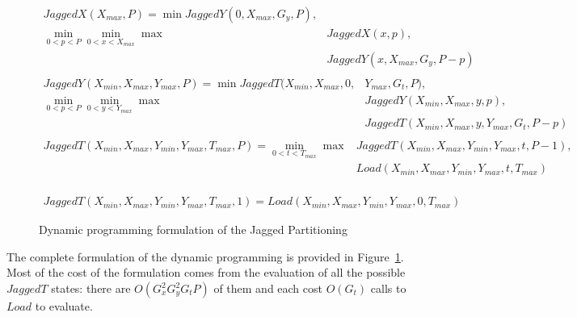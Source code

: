 \documentclass[10pt, conference, compsocconf]{IEEEtran}
\begin{document}
\begin{figure}
  \begin{equation}
    \begin{split}
    JaggedX(X_{max}, P)= \min JaggedY(0,X_{max}, G_y, P), & \\
                        \min_{0 < p < P} \min_{0<x<X_{max}} \max & JaggedX(x,p),\\
                                                     & JaggedY(x,X_{max}, G_y, P-p)\\
    \end{split}
  \end{equation}
  \begin{equation}
    \begin{split}
    JaggedY(X_{min}, X_{max}, Y_{max}, P)= \min JaggedT(X_{min},X_{max}, 0, & Y_{max}, G_t, P),  \\
                        \min_{0 < p < P} \min_{0<y<Y_{max}} \max & JaggedY(X_{min}, X_{max}, y, p),\\
                                                      & JaggedT(X_{min}, X_{max}, y,Y_{max}, G_t , P-p)\\
    \end{split}
  \end{equation}
  \begin{equation}
      \begin{split}
    JaggedT(X_{min}, X_{max}, Y_{min}, Y_{max}, T_{max}, P)= \min_{0<t<T_{max}} \max & JaggedT(X_{min}, X_{max}, Y_{min}, Y_{max}, t, P-1),\\
                                                                       & Load(X_{min}, X_{max}, Y_{min}, Y_{max}, t, T_{max})\\
      \end{split}
  \end{equation}

  \begin{equation}
    \begin{split}
      JaggedT(X_{min}, X_{max}, Y_{min}, Y_{max}, T_{max}, 1) = Load (X_{min}, X_{max}, Y_{min}, Y_{max}, 0, T_{max})
    \end{split}
  \end{equation}
      
  \caption{Dynamic programming formulation of the Jagged Partitioning}
  \label{fig:dp:jagged}
\end{figure}

The complete formulation of the dynamic programming is provided in
Figure~\ref{fig:dp:jagged}. Most of the cost of the formulation comes
from the evaluation of all the possible $JaggedT$ states: there are
$O(G_x^2 G_y^2 G_t P)$ of them and each cost $O(G_t)$ calls to $Load$
to evaluate.
\end{document}

